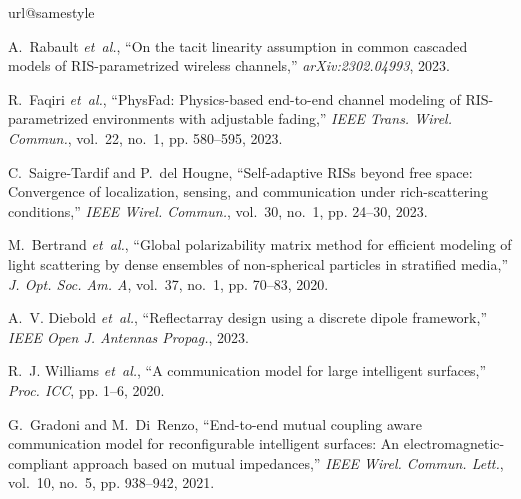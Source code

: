 \documentclass[journal,12pt,onecolumn,draftclsnofoot]{IEEEtran}
\begin{document}

%


\begin{thebibliography}{10}
\providecommand{\url}[1]{#1}
\csname url@samestyle\endcsname
\providecommand{\newblock}{\relax}
\providecommand{\bibinfo}[2]{#2}
\providecommand{\BIBentrySTDinterwordspacing}{\spaceskip=0pt\relax}
\providecommand{\BIBentryALTinterwordstretchfactor}{4}
\providecommand{\BIBentryALTinterwordspacing}{\spaceskip=\fontdimen2\font plus
\BIBentryALTinterwordstretchfactor\fontdimen3\font minus
  \fontdimen4\font\relax}
\providecommand{\BIBforeignlanguage}[2]{{%
\expandafter\ifx\csname l@#1\endcsname\relax
\typeout{** WARNING: IEEEtran.bst: No hyphenation pattern has been}%
\typeout{** loaded for the language `#1'. Using the pattern for}%
\typeout{** the default language instead.}%
\else
\language=\csname l@#1\endcsname
\fi
#2}}
\providecommand{\BIBdecl}{\relax}
\BIBdecl

A.~Rabault \emph{et~al.}, ``On the tacit linearity assumption in common
  cascaded models of {RIS}-parametrized wireless channels,''
  \emph{arXiv:2302.04993}, 2023.

R.~Faqiri \emph{et~al.}, ``{PhysFad}: Physics-based end-to-end channel modeling
  of {RIS}-parametrized environments with adjustable fading,'' \emph{IEEE
  Trans. Wirel. Commun.}, vol.~22, no.~1, pp. 580--595, 2023.

C.~Saigre-Tardif and P.~del Hougne, ``Self-adaptive {RISs} beyond free space:
  Convergence of localization, sensing, and communication under rich-scattering
  conditions,'' \emph{IEEE Wirel. Commun.}, vol.~30, no.~1, pp. 24--30, 2023.

M.~Bertrand \emph{et~al.}, ``Global polarizability matrix method for efficient
  modeling of light scattering by dense ensembles of non-spherical particles in
  stratified media,'' \emph{J. Opt. Soc. Am. A}, vol.~37, no.~1, pp. 70--83,
  2020.

A.~V. Diebold \emph{et~al.}, ``Reflectarray design using a discrete dipole
  framework,'' \emph{IEEE Open J. Antennas Propag.}, 2023.

R.~J. Williams \emph{et~al.}, ``A communication model for large intelligent
  surfaces,'' \emph{Proc. ICC}, pp. 1--6, 2020.

G.~Gradoni and M.~Di~Renzo, ``End-to-end mutual coupling aware communication
  model for reconfigurable intelligent surfaces: An electromagnetic-compliant
  approach based on mutual impedances,'' \emph{IEEE Wirel. Commun. Lett.},
  vol.~10, no.~5, pp. 938--942, 2021.


\end{thebibliography}
\end{document}
